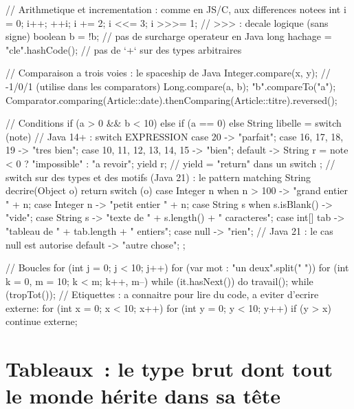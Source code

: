 \begin{codejava}
// Arithmetique et incrementation : comme en JS/C, aux differences notees
int i = 0; i++; ++i; i += 2; i <<= 3; i >>>= 1;         // >>> : decale logique (sans signe)
boolean b = !b;                                         // pas de surcharge operateur en Java
long hachage = "cle".hashCode();                        // pas de `+` sur des types arbitraires

// Comparaison a trois voies : le spaceship de Java
Integer.compare(x, y);                                  // -1/0/1 (utilise dans les comparators)
Long.compare(a, b);
"b".compareTo("a");
Comparator.comparing(Article::date).thenComparing(Article::titre).reversed();

// Conditions
if (a > 0 && b < 10) { } else if (a == 0) { } else { }
String libelle = switch (note) {                        // Java 14+ : switch EXPRESSION
    case 20 -> "parfait";
    case 16, 17, 18, 19 -> "tres bien";
    case 10, 11, 12, 13, 14, 15 -> "bien";
    default -> {
        String r = note < 0 ? "impossible" : "a revoir";
        yield r;                                        // yield = "return" dans un switch
    }
};
// switch sur des types et des motifs (Java 21) : le pattern matching
String decrire(Object o) {
    return switch (o) {
        case Integer n when n > 100 -> "grand entier " + n;
        case Integer n -> "petit entier " + n;
        case String s when s.isBlank() -> "vide";
        case String s -> "texte de " + s.length() + " caracteres";
        case int[] tab -> "tableau de " + tab.length + " entiers";
        case null -> "rien";                             // Java 21 : le cas null est autorise
        default -> "autre chose";
    };
}

// Boucles
for (int j = 0; j < 10; j++) { }
for (var mot : "un deux".split(" ")) { }
for (int k = 0, m = 10; k < m; k++, m--) { }
while (it.hasNext()) { }
do { travail(); } while (tropTot());
// Etiquettes : a connaitre pour lire du code, a eviter d'ecrire
externe: for (int x = 0; x < 10; x++) { for (int y = 0; y < 10; y++) { if (y > x) continue externe; } }
\end{codejava}

\section{Tableaux~: le type brut dont tout le monde h\'erite dans sa t\^ete}

